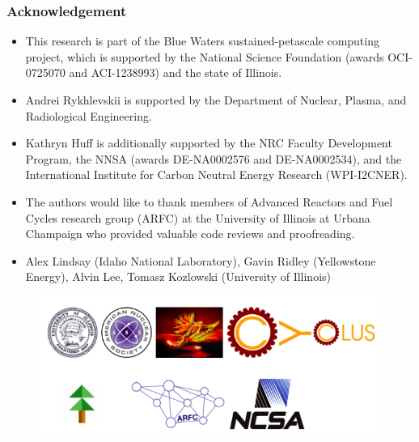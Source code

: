\begin{frame}
  \frametitle{Acknowledgement}
  \begin{itemize}
    \item This research is part of the Blue Waters sustained-petascale computing project, 
which is supported by the National Science Foundation (awards OCI-0725070 and 
ACI-1238993) and the state of Illinois.
    \item Andrei Rykhlevskii is supported by the Department of Nuclear, Plasma, and Radiological Engineering.
    \item Kathryn Huff is additionally supported by the NRC Faculty Development Program, the NNSA (awards 
    DE-NA0002576 and DE-NA0002534), and the International Institute for Carbon Neutral Energy Research (WPI-I2CNER).
    \item The authors would like to thank  members of Advanced Reactors and Fuel Cycles
research group (ARFC) at the University of Illinois at Urbana Champaign who 
provided valuable code reviews and proofreading.
    \item Alex Lindsay (Idaho National Laboratory), Gavin Ridley (Yellowstone Energy), Alvin Lee, Tomasz Kozlowski (University of Illinois)
  \end{itemize}
    \begin{figure}[t]
   \hspace*{-0.4in}
   \includegraphics[height=0.25\textheight]{./images/acks.png}
    \end{figure}
\end{frame}
